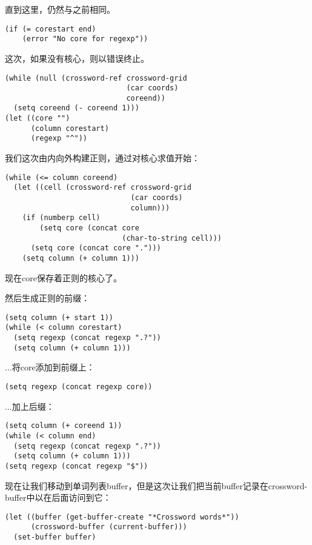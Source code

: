 直到这里，仍然与之前相同。

\begin{verbatim}
(if (= corestart end)
    (error "No core for regexp"))
\end{verbatim}

这次，如果没有核心，则以错误终止。

\begin{verbatim}
(while (null (crossword-ref crossword-grid
                            (car coords)
                            coreend))
  (setq coreend (- coreend 1)))
(let ((core "")
      (column corestart)
      (regexp "^"))
\end{verbatim}

我们这次由内向外构建正则，通过对核心求值开始：

\begin{verbatim}
(while (<= column coreend)
  (let ((cell (crossword-ref crossword-grid
                             (car coords)
                             column)))
    (if (numberp cell)
        (setq core (concat core
                           (char-to-string cell)))
      (setq core (concat core ".")))
    (setq column (+ column 1)))
\end{verbatim}

现在core保存着正则的核心了。

然后生成正则的前缀：

\begin{verbatim}
(setq column (+ start 1))
(while (< column corestart)
  (setq regexp (concat regexp ".?"))
  (setq column (+ column 1)))
\end{verbatim}

...将core添加到前缀上：

\begin{verbatim}
(setq regexp (concat regexp core))
\end{verbatim}

...加上后缀：

\begin{verbatim}
(setq column (+ coreend 1))
(while (< column end)
  (setq regexp (concat regexp ".?"))
  (setq column (+ column 1)))
(setq regexp (concat regexp "$"))
\end{verbatim}

现在让我们移动到单词列表buffer，但是这次让我们把当前buffer记录在crossword-buffer中以在后面访问到它：

\begin{verbatim}
(let ((buffer (get-buffer-create "*Crossword words*"))
      (crossword-buffer (current-buffer)))
  (set-buffer buffer)
\end{verbatim}

